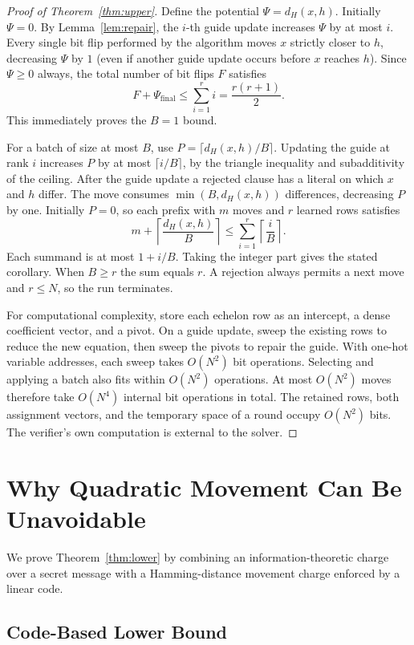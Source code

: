 \documentclass[11pt,a4paper]{article}
\theoremstyle{definition}
\theoremstyle{remark}
\begin{document}
\begin{proof}[Proof of Theorem~\ref{thm:upper}]
Define the potential $\Psi = d_H(x, h)$. Initially $\Psi = 0$. By Lemma~\ref{lem:repair}, the $i$-th guide update increases $\Psi$ by at most $i$. Every single bit flip performed by the algorithm moves $x$ strictly closer to $h$, decreasing $\Psi$ by $1$ (even if another guide update occurs before $x$ reaches $h$). Since $\Psi \ge 0$ always, the total number of bit flips $F$ satisfies
\[
    F + \Psi_{\mathrm{final}} \le \sum_{i=1}^r i = \frac{r(r+1)}{2}.
\]
This immediately proves the $B=1$ bound.

For a batch of size at most $B$, use $P=\lceil d_H(x,h)/B\rceil$. Updating the guide at rank $i$ increases $P$ by at most $\lceil i/B\rceil$, by the triangle inequality and subadditivity of the ceiling. After the guide update a rejected clause has a literal on which $x$ and $h$ differ. The move consumes $\min(B,d_H(x,h))$ differences, decreasing $P$ by one. Initially $P=0$, so each prefix with $m$ moves and $r$ learned rows satisfies
\[
  m + \left\lceil\frac{d_H(x,h)}{B}\right\rceil
  \le \sum_{i=1}^r\left\lceil\frac{i}{B}\right\rceil .
\]
Each summand is at most $1+i/B$. Taking the integer part gives the stated corollary. When $B\ge r$ the sum equals $r$. A rejection always permits a next move and $r\le N$, so the run terminates.

For computational complexity, store each echelon row as an intercept, a dense coefficient vector, and a pivot. On a guide update, sweep the existing rows to reduce the new equation, then sweep the pivots to repair the guide. With one-hot variable addresses, each sweep takes $O(N^2)$ bit operations. Selecting and applying a batch also fits within $O(N^2)$ operations. At most $O(N^2)$ moves therefore take $O(N^4)$ internal bit operations in total. The retained rows, both assignment vectors, and the temporary space of a round occupy $O(N^2)$ bits. The verifier's own computation is external to the solver.
\end{proof}

\section{Why Quadratic Movement Can Be Unavoidable}\label{sec:lower}

We prove Theorem~\ref{thm:lower} by combining an information-theoretic charge over a secret message with a Hamming-distance movement charge enforced by a linear code.

\subsection{Code-Based Lower Bound}
\end{document}
